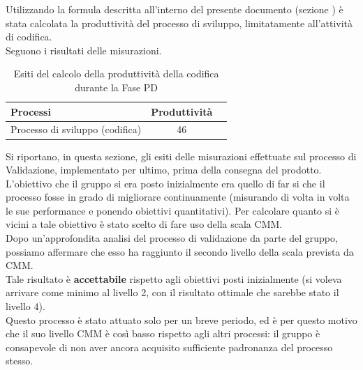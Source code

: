 			Utilizzando la formula descritta all'interno del presente documento (sezione ) è stata calcolata la produttività del processo di sviluppo, limitatamente all'attività di codifica. \\
			Seguono i risultati delle misurazioni.
			\\ 
			\begin{table}[H]
				\centering
				\begin{tabu}{| l | c | c |}
					\hline
						Processi 						& Produttività		\\ \hline \hline
						Processo di sviluppo (codifica) & 46   \\ \hline
				\end{tabu}
				\caption{Esiti del calcolo della produttività della codifica durante la Fase PD}
			\end{table}	
			
		Si riportano, in questa sezione, gli esiti delle misurazioni effettuate sul processo di Validazione, implementato per ultimo, prima della consegna del prodotto.
				L'obiettivo che il gruppo si era posto inizialmente era quello di far si che il processo fosse in grado di migliorare continuamente (misurando di volta in volta le sue performance e ponendo obiettivi quantitativi). Per calcolare quanto si è vicini a tale obiettivo è stato scelto di fare uso della scala CMM.\\
				Dopo un'approfondita analisi del processo di validazione da parte del gruppo, possiamo affermare che esso ha raggiunto il secondo livello della scala prevista da CMM.\\
				Tale risultato è \textbf{accettabile} rispetto agli obiettivi posti inizialmente (si voleva arrivare come minimo al livello 2, con il risultato ottimale che sarebbe stato il livello 4).\\
				Questo processo è stato attuato solo per un breve periodo, ed è per questo motivo che il suo livello CMM è così basso rispetto agli altri processi: il gruppo è consapevole di non aver ancora acquisito sufficiente padronanza del processo stesso.
			
